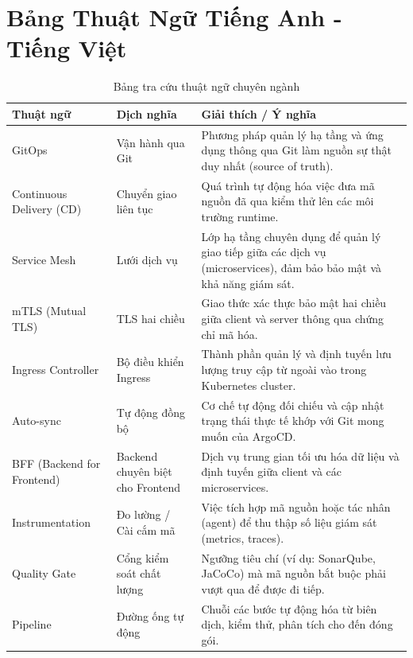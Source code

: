 \section{Bảng Thuật Ngữ Tiếng Anh - Tiếng Việt}

\begin{table}[H]
\centering
\caption{Bảng tra cứu thuật ngữ chuyên ngành}
\begin{tabular}{|p{3.2cm}|p{3.8cm}|p{8.2cm}|}
\hline
\textbf{Thuật ngữ} & \textbf{Dịch nghĩa} & \textbf{Giải thích / Ý nghĩa} \\
\hline
GitOps & Vận hành qua Git & Phương pháp quản lý hạ tầng và ứng dụng thông qua Git làm nguồn sự thật duy nhất (source of truth). \\
\hline
Continuous Delivery (CD) & Chuyển giao liên tục & Quá trình tự động hóa việc đưa mã nguồn đã qua kiểm thử lên các môi trường runtime. \\
\hline
Service Mesh & Lưới dịch vụ & Lớp hạ tầng chuyên dụng để quản lý giao tiếp giữa các dịch vụ (microservices), đảm bảo bảo mật và khả năng giám sát. \\
\hline
mTLS (Mutual TLS) & TLS hai chiều & Giao thức xác thực bảo mật hai chiều giữa client và server thông qua chứng chỉ mã hóa. \\
\hline
Ingress Controller & Bộ điều khiển Ingress & Thành phần quản lý và định tuyến lưu lượng truy cập từ ngoài vào trong Kubernetes cluster. \\
\hline
Auto-sync & Tự động đồng bộ & Cơ chế tự động đối chiếu và cập nhật trạng thái thực tế khớp với Git mong muốn của ArgoCD. \\
\hline
BFF (Backend for Frontend) & Backend chuyên biệt cho Frontend & Dịch vụ trung gian tối ưu hóa dữ liệu và định tuyến giữa client và các microservices. \\
\hline
Instrumentation & Đo lường / Cài cắm mã & Việc tích hợp mã nguồn hoặc tác nhân (agent) để thu thập số liệu giám sát (metrics, traces). \\
\hline
Quality Gate & Cổng kiểm soát chất lượng & Ngưỡng tiêu chí (ví dụ: SonarQube, JaCoCo) mà mã nguồn bắt buộc phải vượt qua để được đi tiếp. \\
\hline
Pipeline & Đường ống tự động & Chuỗi các bước tự động hóa từ biên dịch, kiểm thử, phân tích cho đến đóng gói. \\
\hline
\end{tabular}
\end{table}
